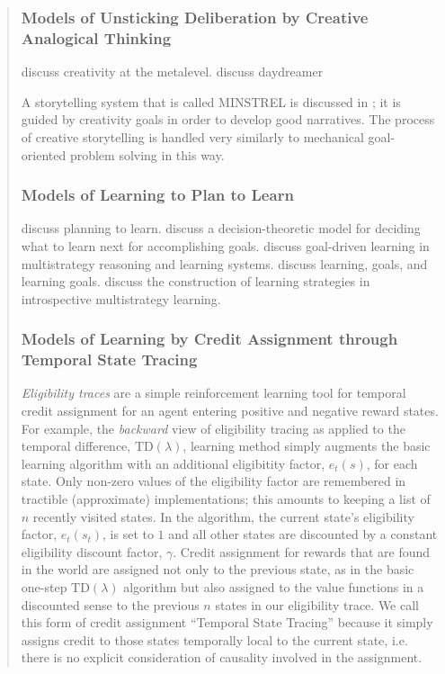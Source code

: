 \begin{quotation}
\subsubsection{Models of Unsticking Deliberation by Creative Analogical Thinking}

\cite{buchanan2001cma} discuss creativity at the metalevel.
\cite{mueller1990dha} discuss daydreamer

A storytelling system that is called MINSTREL is discussed in \cite{turner1994cpc}; it is guided by creativity goals in order to develop good narratives.
The process of creative storytelling is handled very similarly to mechanical goal-oriented problem solving in this way.

\subsubsection{Models of Learning to Plan to Learn}

\cite{ram1995ptl} discuss planning to learn.
\cite{desjardins1995gdl} discuss a decision-theoretic model for deciding what to learn next for accomplishing goals.
\cite{ram1995gdlmrls} discuss goal-driven learning in multistrategy reasoning and learning systems.
\cite{ram1995lga} discuss learning, goals, and learning goals.
\cite{cox1999iml} discuss the construction of learning strategies in introspective multistrategy learning.

\subsubsection{Models of Learning by Credit Assignment through Temporal State Tracing}

\emph{Eligibility traces} are a simple reinforcement learning tool for temporal credit assignment for an agent entering positive and negative reward states.
For example, the \emph{backward} view of eligibility tracing as applied to the temporal difference, $\text{TD}(\lambda)$, learning method simply augments the basic learning algorithm with an additional eligibitity factor, $e_t(s)$, for each state.
Only non-zero values of the eligibility factor are remembered in tractible (approximate) implementations; this amounts to keeping a list of $n$ recently visited states.
In the algorithm, the current state's eligibility factor, $e_t(s_t)$, is set to $1$ and all other states are discounted by a constant eligibility discount factor, $\gamma$.
Credit assignment for rewards that are found in the world are assigned not only to the previous state, as in the basic one-step $\text{TD}(\lambda)$ algorithm but also assigned to the value functions in a discounted sense to the previous $n$ states in our eligibility trace.
We call this form of credit assignment ``Temporal State Tracing'' because it simply assigns credit to those states temporally local to the current state, i.e. there is no explicit consideration of causality involved in the assignment.


\end{quotation}
